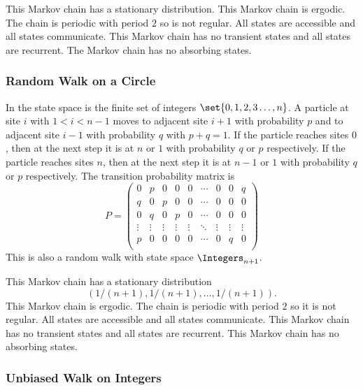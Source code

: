 \documentclass[12pt]{article}
\begin{document}
This Markov chain has a stationary distribution.  This Markov chain is
ergodic.  The chain is periodic with period \( 2 \) so is not regular.
All states are accessible and all states communicate.  This Markov chain
has no transient states and all states are recurrent.  The Markov chain
has no absorbing states.

\subsubsection*{Random Walk on a Circle}

In  the state space is the finite set of
integers \( \set{0, 1, 2, 3 \dots, n} \).  A particle at%
site \( i \) with \( 1 < i < n-1 \) moves to adjacent site \( i+1 \)
with probability \( p \) and to adjacent site \( i-1 \) with probability
\( q \) with \( p+q = 1 \).  If the particle reaches sites \( 0 \), then
at the next step it is at \( n \) or \( 1 \) with probability \( q \) or
\( p \) respectively.  If the particle reaches sites \( n \), then at
the next step it is at \( n-1 \) or \( 1 \) with probability \( q \) or \(
p \) respectively.  The transition probability matrix is
\[
    P =
    \begin{pmatrix}
        0 & p & 0 & 0 & 0 & \cdots & 0 & 0 & q \\
        q & 0 & p & 0 & 0 & \cdots & 0 & 0 & 0 \\
        0 & q & 0 & p & 0 & \cdots & 0 & 0 & 0 \\
        \vdots & \vdots & \vdots & \vdots & \vdots & \ddots & \vdots
        & \vdots & \vdots \\
        p & 0 & 0 & 0 & 0 & \cdots & 0 & q & 0 \\
    \end{pmatrix}
\] This is also a random walk with state space \( \Integers_{n+1} \).

  This Markov chain has a stationary distribution
  \[ (1/(n+1), 1/(n+1),\dots, 1/(n+1)).
  \]  This Markov chain is ergodic.  The chain is
periodic with period \( 2 \) so it is not regular.  All states are
accessible and all states communicate.  This Markov chain has no
transient states and all states are recurrent.  This Markov chain has no
absorbing states.

\subsubsection*{Unbiased Walk on Integers}
\end{document}
